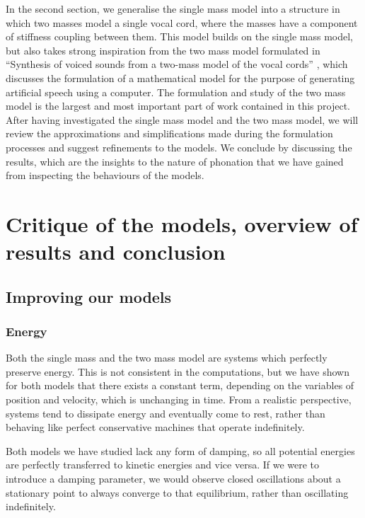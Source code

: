 \documentclass{report}
\begin{document}
In the second section, we generalise the single mass model into a structure in which two masses model a single vocal cord,
where the masses have a component of stiffness coupling between them.
This model builds on the single mass model,
but also takes strong inspiration from the two mass model formulated in ``Synthesis of voiced sounds from a two-mass model of the vocal cords'' \cite{ishizaka_flanagan_1972},
which discusses the formulation of a mathematical model for the purpose of generating artificial speech using a computer.
The formulation and study of the two mass model is the largest and most important part of work contained in this project.
After having investigated the single mass model and the two mass model,
we will review the approximations and simplifications made during the formulation processes and suggest refinements to the models.
We conclude by discussing the results, which are the insights to the nature of phonation that we have gained from inspecting the behaviours of the models.





\chapter{Critique of the models, overview of results and conclusion}
\label{cha:conclusion}

\section{Improving our models}

\subsection{Energy}

Both the single mass and the two mass model are systems which perfectly preserve energy.
This is not consistent in the computations,
but we have shown for both models that there exists a constant term,
depending on the variables of position and velocity,
which is unchanging in time.
From a realistic perspective,
systems tend to dissipate energy and eventually come to rest,
rather than behaving like perfect conservative machines that operate indefinitely.

Both models we have studied lack any form of damping,
so all potential energies are perfectly transferred to kinetic energies and vice versa.
If we were to introduce a damping parameter,
we would observe closed oscillations about a stationary point to always converge to that equilibrium,
rather than oscillating indefinitely.
\end{document}
